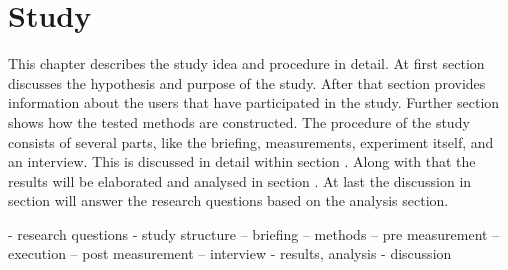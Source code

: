 \chapter{Study}
This chapter describes the study idea and procedure in detail. At first section  discusses the hypothesis and purpose of the study. After that section  provides information about the users that have participated in the study. Further section  shows how the tested methods are constructed. The procedure of the study consists of several parts, like the briefing, measurements, experiment itself, and an interview. This is discussed in detail within section . Along with that the results will be elaborated and analysed in section . At last the discussion in section  will answer the research questions based on the analysis section.








- research questions
- study structure
-- briefing
-- methods
-- pre measurement
-- execution
-- post measurement
-- interview
- results, analysis
- discussion
